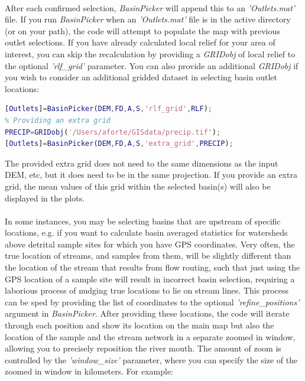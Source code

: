 \paragraph{}After each confirmed selection, \textit{BasinPicker} will append this to an \textit{'Outlets.mat'} file. If you run \textit{BasinPicker} when an \textit{'Outlets.mat'} file is in the active directory (or on your path), the code will attempt to populate the map with previous outlet selections. If you have already calculated local relief for your area of interest, you can skip the recalculation by providing a \textit{GRIDobj} of local relief to the optional \textit{'rlf\_grid'} parameter. You can also provide an additional \textit{GRIDobj} if you wish to consider an additional gridded dataset in selecting basin outlet locations:

\begin{lstlisting}[language=Matlab]
% Providing a precomputed relief grid
[Outlets]=BasinPicker(DEM,FD,A,S,'rlf_grid',RLF);
% Providing an extra grid
PRECIP=GRIDobj('/Users/aforte/GISdata/precip.tif');
[Outlets]=BasinPicker(DEM,FD,A,S,'extra_grid',PRECIP);
\end{lstlisting}

\noindent
The provided extra grid does not need to the same dimensions as the input DEM, etc, but it does need to be in the same projection. If you provide an extra grid, the mean values of this grid within the selected basin(s) will also be displayed in the plots. 

\paragraph{}In some instances, you may be selecting basins that are upstream of specific locations, e.g. if you want to calculate basin averaged statistics for watersheds above detrital sample sites for which you have GPS coordinates. Very often, the true location of streams, and samples from them, will be slightly different than the location of the stream that results from flow routing, such that just using the GPS location of a sample site will result in incorrect basin selection, requiring a laborious process of nudging true locations to lie on stream lines. This process can be sped by providing the list of coordinates to the optional \textit{'refine\_positions'} argument in \textit{BasinPicker}. After providing these locations, the code will iterate through each position and show its location on the main map but also the location of the sample and the stream network in a separate zoomed in window, allowing you to precisely reposition the river mouth. The amount of zoom is controlled by the \textit{'window\_size'} parameter, where you can specify the size of the zoomed in window in kilometers. For example:

